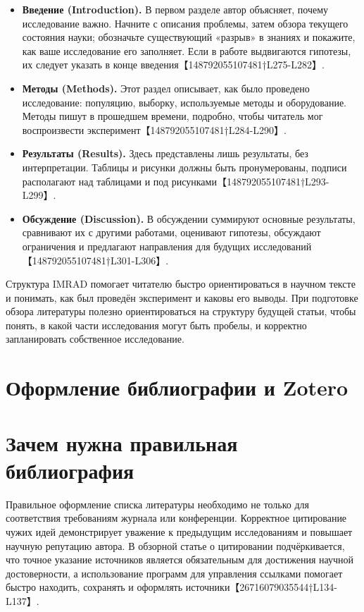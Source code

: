 \documentclass[
  russian,
  letterpaper,
]{book}
\providecommand{\tightlist}{%
  \setlength{\itemsep}{0pt}\setlength{\parskip}{0pt}}
\begin{document}
\begin{itemize}
\tightlist
\item
  \textbf{Введение (Introduction).} В первом разделе автор объясняет,
  почему исследование важно. Начните с описания проблемы, затем обзора
  текущего состояния науки; обозначьте существующий «разрыв» в знаниях и
  покажите, как ваше исследование его заполняет. Если в работе
  выдвигаются гипотезы, их следует указать в конце
  введения【148792055107481†L275-L282】.
\item
  \textbf{Методы (Methods).} Этот раздел описывает, как было проведено
  исследование: популяцию, выборку, используемые методы и оборудование.
  Методы пишут в прошедшем времени, подробно, чтобы читатель мог
  воспроизвести эксперимент【148792055107481†L284-L290】.
\item
  \textbf{Результаты (Results).} Здесь представлены лишь результаты, без
  интерпретации. Таблицы и рисунки должны быть пронумерованы, подписи
  располагают над таблицами и под
  рисунками【148792055107481†L293-L299】.
\item
  \textbf{Обсуждение (Discussion).} В обсуждении суммируют основные
  результаты, сравнивают их с другими работами, оценивают гипотезы,
  обсуждают ограничения и предлагают направления для будущих
  исследований【148792055107481†L301-L306】.
\end{itemize}

Структура IMRAD помогает читателю быстро ориентироваться в научном
тексте и понимать, как был проведён эксперимент и каковы его выводы. При
подготовке обзора литературы полезно ориентироваться на структуру
будущей статьи, чтобы понять, в какой части исследования могут быть
пробелы, и корректно запланировать собственное исследование.

\chapter{Оформление библиографии и
Zotero}\label{ux43eux444ux43eux440ux43cux43bux435ux43dux438ux435-ux431ux438ux431ux43bux438ux43eux433ux440ux430ux444ux438ux438-ux438-zotero}

\chapter{Зачем нужна правильная библиография}\label{sec-bibliography}

Правильное оформление списка литературы необходимо не только для
соответствия требованиям журнала или конференции. Корректное цитирование
чужих идей демонстрирует уважение к предыдущим исследованиям и повышает
научную репутацию автора. В обзорной статье о цитировании
подчёркивается, что точное указание источников является обязательным для
достижения научной достоверности, а использование программ для
управления ссылками помогает быстро находить, сохранять и оформлять
источники【26716079035544†L134-L137】.
\end{document}
